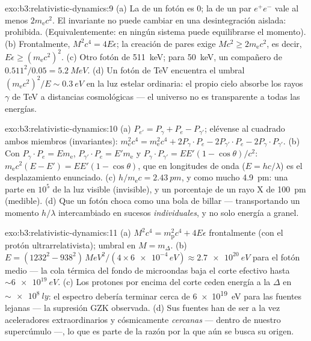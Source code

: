 \begin{solution}{exo:b3:relativistic-dynamics:9}
(a) La  de un fotón es $0$; la de un par $e^+e^-$ vale al
menos $2m_{\text{e}}c^2$. El invariante no puede cambiar en una
desintegración aislada: prohibida. (Equivalentemente: en ningún sistema
puede equilibrarse el momento). (b)
Frontalmente, $M^2c^4 = 4E\epsilon$; la creación de pares exige $Mc^2 \ge
2m_{\text{e}}c^2$, es decir, $E\epsilon \ge (m_{\text{e}}c^2)^2$. (c)
Otro fotón de \qty{511}{keV}; para \qty{50}{keV}, un compañero de
$0.511^2/0.05 = \qty{5.2}{MeV}$. (d) Un fotón de TeV encuentra el umbral
$(m_{\text{e}}c^2)^2/E \sim \qty{0.3}{eV}$ en la luz estelar ordinaria: el
propio cielo absorbe los rayos $\gamma$ de TeV a distancias cosmológicas
--- el universo no es transparente a todas las energías.
\end{solution}

\begin{solution}{exo:b3:relativistic-dynamics:10}
(a) $P_{e'} = P_\gamma + P_e - P_{\gamma'}$; elévense al cuadrado ambos
miembros (invariantes): $m_{\text{e}}^2c^4 = m_{\text{e}}^2c^4 + 2P_\gamma\!
\cdot\!P_e - 2P_{\gamma'}\!\cdot\!P_e - 2P_\gamma\!\cdot\!P_{\gamma'}$.
(b) Con $P_\gamma\!\cdot\!P_e = E m_{\text{e}}$,
$P_{\gamma'}\!\cdot\!P_e = E'm_{\text{e}}$ y $P_\gamma\!\cdot\!
P_{\gamma'} = EE'(1 - \cos\theta)/c^2$:
$m_{\text{e}}c^2(E - E') = EE'(1 - \cos\theta)$, que en longitudes de onda
($E = hc/\lambda$) es el desplazamiento enunciado. (c) $h/m_{\text{e}}c =
\qty{2.43}{pm}$, y como mucho \qty{4.9}{pm}: una parte en $10^5$ de la luz
visible (invisible), y un porcentaje de un rayo X de \qty{100}{pm}
(medible). (d) Que un fotón choca como una bola de billar ---
transportando un momento $h/\lambda$ intercambiado en sucesos
\emph{individuales}, y no solo energía a granel.
\end{solution}

\begin{solution}{exo:b3:relativistic-dynamics:11}
(a) $M^2c^4 = m_{\text{p}}^2c^4 + 4E\epsilon$ frontalmente (con el protón
ultrarrelativista); umbral en $M = m_\Delta$. (b) $E =
(1232^2 - 938^2)\,\unit{MeV^2}/(4 \times \num{6e-4}\,\unit{eV})
\approx \qty{2.7e20}{eV}$ para el fotón medio --- la cola térmica
del fondo de microondas baja el corte efectivo hasta
$\sim\qty{6e19}{eV}$. (c) Los protones por encima del corte ceden energía a
la $\Delta$ en $\sim\qty{e8}{ly}$: el espectro debería terminar cerca de
\qty{6e19}{eV} para las fuentes lejanas --- la supresión GZK observada.
(d) Sus fuentes han de ser a la vez aceleradores extraordinarios y
cósmicamente \emph{cercanas} --- dentro de nuestro supercúmulo ---, lo que
es parte de la razón por la que aún se busca su origen.
\end{solution}


